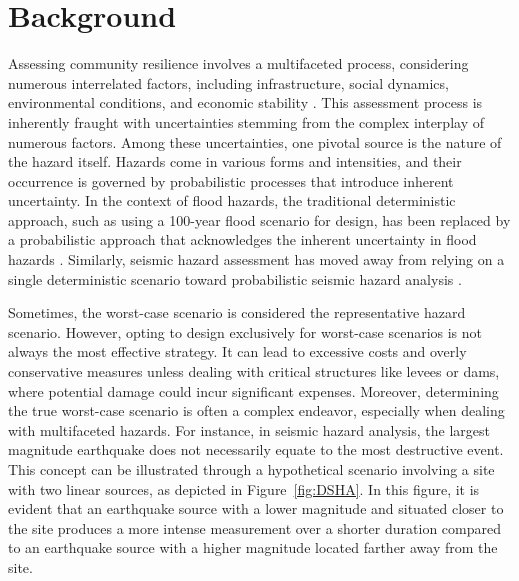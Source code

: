 \section{Background}
    Assessing community resilience involves a multifaceted process, considering numerous interrelated factors, including infrastructure, social dynamics, environmental conditions, and economic stability \cite{community_resilience_group_community_2015,community_resilience_group_community_2015-1}. This assessment process is inherently fraught with uncertainties stemming from the complex interplay of numerous factors. Among these uncertainties, one pivotal source is the nature of the hazard itself. Hazards come in various forms and intensities, and their occurrence is governed by probabilistic processes that introduce inherent uncertainty. In the context of flood hazards, the traditional deterministic approach, such as using a 100-year flood scenario for design, has been replaced by a probabilistic approach that acknowledges the inherent uncertainty in flood hazards \cite{quagliolo_experimental_2021,bulti_community_2019,eslamian_flood_2023,winter_event_2020}. Similarly, seismic hazard assessment has moved away from relying on a single deterministic scenario \cite{tantala_earthquake_2008,cardona_seismic_1997,faccioli_study_1999} toward probabilistic seismic hazard analysis \cite{gerstenberger_probabilistic_2020,campbell_seismic_2002}. 
    
    Sometimes, the worst-case scenario is considered the representative hazard scenario. However, opting to design exclusively for worst-case scenarios is not always the most effective strategy. It can lead to excessive costs and overly conservative measures unless dealing with critical structures like levees or dams, where potential damage could incur significant expenses. Moreover, determining the true worst-case scenario is often a complex endeavor, especially when dealing with multifaceted hazards. For instance, in seismic hazard analysis, the largest magnitude earthquake does not necessarily equate to the most destructive event. This concept can be illustrated through a hypothetical scenario involving a site with two linear sources, as depicted in Figure~\ref{fig:DSHA}. In this figure, it is evident that an earthquake source with a lower magnitude and situated closer to the site produces a more intense measurement over a shorter duration compared to an earthquake source with a higher magnitude located farther away from the site.

     
 
